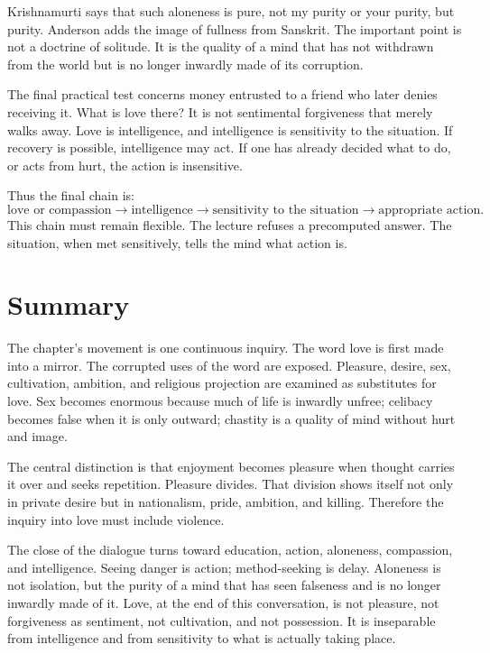 Krishnamurti says that such aloneness is pure, not my purity or your purity, but purity. Anderson adds the image of fullness from Sanskrit. The important point is not a doctrine of solitude. It is the quality of a mind that has not withdrawn from the world but is no longer inwardly made of its corruption.

The final practical test concerns money entrusted to a friend who later denies receiving it. What is love there? It is not sentimental forgiveness that merely walks away. Love is intelligence, and intelligence is sensitivity to the situation. If recovery is possible, intelligence may act. If one has already decided what to do, or acts from hurt, the action is insensitive.

Thus the final chain is:
\begin{equation}
\text{love or compassion}
\longrightarrow
\text{intelligence}
\longrightarrow
\text{sensitivity to the situation}
\longrightarrow
\text{appropriate action}.
\end{equation}
This chain must remain flexible. The lecture refuses a precomputed answer. The situation, when met sensitively, tells the mind what action is.

\section{Summary}

The chapter's movement is one continuous inquiry. The word love is first made into a mirror. The corrupted uses of the word are exposed. Pleasure, desire, sex, cultivation, ambition, and religious projection are examined as substitutes for love. Sex becomes enormous because much of life is inwardly unfree; celibacy becomes false when it is only outward; chastity is a quality of mind without hurt and image.

The central distinction is that enjoyment becomes pleasure when thought carries it over and seeks repetition. Pleasure divides. That division shows itself not only in private desire but in nationalism, pride, ambition, and killing. Therefore the inquiry into love must include violence.

The close of the dialogue turns toward education, action, aloneness, compassion, and intelligence. Seeing danger is action; method-seeking is delay. Aloneness is not isolation, but the purity of a mind that has seen falseness and is no longer inwardly made of it. Love, at the end of this conversation, is not pleasure, not forgiveness as sentiment, not cultivation, and not possession. It is inseparable from intelligence and from sensitivity to what is actually taking place.